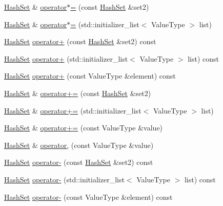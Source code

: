 \begin{DoxyCompactItemize}
\item 
\mbox{\hyperlink{classHashSet}{Hash\+Set}} \& \mbox{\hyperlink{classHashSet_a87bb5997cef7635bd299a5dc2d3ad4d1}{operator$\ast$=}} (const \mbox{\hyperlink{classHashSet}{Hash\+Set}} \&set2)
\item 
\mbox{\hyperlink{classHashSet}{Hash\+Set}} \& \mbox{\hyperlink{classHashSet_a2a831fcda2211be2b25e2a9908465923}{operator$\ast$=}} (std\+::initializer\+\_\+list$<$ Value\+Type $>$ list)
\item 
\mbox{\hyperlink{classHashSet}{Hash\+Set}} \mbox{\hyperlink{classHashSet_a9a5483372dbdc510d27d08b82b5bc09c}{operator+}} (const \mbox{\hyperlink{classHashSet}{Hash\+Set}} \&set2) const
\item 
\mbox{\hyperlink{classHashSet}{Hash\+Set}} \mbox{\hyperlink{classHashSet_a4407ef198ebf93145db3ae416ef73f16}{operator+}} (std\+::initializer\+\_\+list$<$ Value\+Type $>$ list) const
\item 
\mbox{\hyperlink{classHashSet}{Hash\+Set}} \mbox{\hyperlink{classHashSet_a4fd31573d1b31ecf8fe76e817fc24c29}{operator+}} (const Value\+Type \&element) const
\item 
\mbox{\hyperlink{classHashSet}{Hash\+Set}} \& \mbox{\hyperlink{classHashSet_ae5db24ba415c0583ad5bf2a82db4db54}{operator+=}} (const \mbox{\hyperlink{classHashSet}{Hash\+Set}} \&set2)
\item 
\mbox{\hyperlink{classHashSet}{Hash\+Set}} \& \mbox{\hyperlink{classHashSet_a56bdb6beeca7193ea3d4845d0e97a604}{operator+=}} (std\+::initializer\+\_\+list$<$ Value\+Type $>$ list)
\item 
\mbox{\hyperlink{classHashSet}{Hash\+Set}} \& \mbox{\hyperlink{classHashSet_af63b3438e0f32d7e2b5027974baa1780}{operator+=}} (const Value\+Type \&value)
\item 
\mbox{\hyperlink{classHashSet}{Hash\+Set}} \& \mbox{\hyperlink{classHashSet_aac8aae69631b881ce37e9329b533b63d}{operator,}} (const Value\+Type \&value)
\item 
\mbox{\hyperlink{classHashSet}{Hash\+Set}} \mbox{\hyperlink{classHashSet_ae30cd1cfd4eb17df8f2d3c3991e2d383}{operator-\/}} (const \mbox{\hyperlink{classHashSet}{Hash\+Set}} \&set2) const
\item 
\mbox{\hyperlink{classHashSet}{Hash\+Set}} \mbox{\hyperlink{classHashSet_a974523da7e472820f69fa92de07ca873}{operator-\/}} (std\+::initializer\+\_\+list$<$ Value\+Type $>$ list) const
\item 
\mbox{\hyperlink{classHashSet}{Hash\+Set}} \mbox{\hyperlink{classHashSet_ac660f492d9235ece4859f7fb0ab1b13b}{operator-\/}} (const Value\+Type \&element) const

\end{DoxyCompactItemize}
